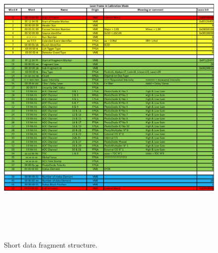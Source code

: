 \begin{appendices}
\begin{figure}[htbp]
\centering
\includegraphics[height=15cm]{figures/short_fragment.pdf}
\caption{Short data fragment structure.}\label{fig:shortfrag}
\end{figure}


\end{appendices}
